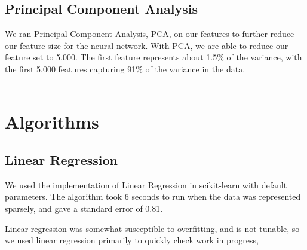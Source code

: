 \documentclass[journal]{IEEEtran}
\begin{document}
\subsection{Principal Component Analysis}
We ran Principal Component Analysis, PCA, on our features to further reduce
our feature size for the neural network. With PCA, we
are able to reduce our feature set to 5,000.  The first feature
represents about 1.5\% of the variance, with the first 5,000 features
capturing 91\% of the variance in the data.
\\
\\

\section{Algorithms}

\subsection{Linear Regression}
We used the implementation of Linear Regression in scikit-learn with default
parameters. The algorithm took 6 seconds to run when the data was represented
sparsely, and gave a standard error of 0.81.
\\
\par Linear regression was somewhat susceptible to overfitting, and is not tunable, so we used
linear regression primarily to quickly check work in progress,
\end{document}
